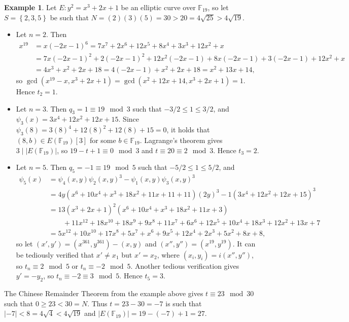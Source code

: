 \documentclass{article}
\newcommand{\F}{\mathbb{F}}
\newcommand{\rb}[1]{\left( #1 \right)}
\renewcommand{\sb}[1]{\left[ #1 \right]}
\newcommand{\cb}[1]{\left\{ #1 \right\}}
\newcommand{\abs}[1]{\left\lvert #1 \right\rvert}
\theoremstyle{definition}\newtheorem*{definition}{Definition}
\theoremstyle{definition}\newtheorem*{example}{Example}
\theoremstyle{definition}\newtheorem*{remark}{Remark}
\begin{document}
\begin{example}
Let $ E : y^2 = x^3 + 2x + 1 $ be an elliptic curve over $ \F_{19} $, so let $ S = \cb{2, 3, 5} $ be such that $ N = \rb{2}\rb{3}\rb{5} = 30 > 20 = 4\sqrt{25} > 4\sqrt{19} $.
\begin{itemize}
\item Let $ n = 2 $. Then
\begin{align*}
x^{19}
& = x\rb{-2x - 1}^6
= 7x^7 + 2x^6 + 12x^5 + 8x^4 + 3x^3 + 12x^2 + x \\
& = 7x\rb{-2x - 1}^2 + 2\rb{-2x - 1}^2 + 12x^2\rb{-2x - 1} + 8x\rb{-2x - 1} + 3\rb{-2x - 1} + 12x^2 + x \\
& = 4x^3 + x^2 + 2x + 18
= 4\rb{-2x - 1} + x^2 + 2x + 18
= x^2 + 13x + 14,
\end{align*}
so $ \gcd\rb{x^{19} - x, x^3 + 2x + 1} = \gcd\rb{x^2 + 12x + 14, x^3 + 2x + 1} = 1 $. Hence $ t_2 = 1 $.
\item Let $ n = 3 $. Then $ q_3 = 1 \equiv 19 \mod 3 $ such that $ -3 / 2 \le 1 \le 3 / 2 $, and $ \psi_3\rb{x} = 3x^4 + 12x^2 + 12x + 15 $. Since $ \psi_3\rb{8} = 3\rb{8}^4 + 12\rb{8}^2 + 12\rb{8} + 15 = 0 $, it holds that $ \rb{8, b} \in E\rb{\F_{19}}\sb{3} $ for some $ b \in \F_{19} $. Lagrange's theorem gives $ 3 \mid \abs{E\rb{\F_{19}}} $, so $ 19 - t + 1 \equiv 0 \mod 3 $ and $ t \equiv 20 \equiv 2 \mod 3 $. Hence $ t_3 = 2 $.
\item Let $ n = 5 $. Then $ q_5 = -1 \equiv 19 \mod 5 $ such that $ -5 / 2 \le 1 \le 5 / 2 $, and
\begin{align*}
\psi_5\rb{x}
& = \psi_4\rb{x, y}\psi_2\rb{x, y}^3 - \psi_1\rb{x, y}\psi_3\rb{x, y}^3 \\
& = 4y\rb{x^6 + 10x^4 + x^3 + 18x^2 + 11x + 11 + 11}\rb{2y}^3 - 1\rb{3x^4 + 12x^2 + 12x + 15}^3 \\
& = 13\rb{x^3 + 2x + 1}^2\rb{x^6 + 10x^4 + x^3 + 18x^2 + 11x + 3} \\
& \qquad + 11x^{12} + 18x^{10} + 18x^9 + 9x^8 + 11x^7 + 6x^6 + 12x^5 + 10x^4 + 18x^3 + 12x^2 + 13x + 7 \\
& = 5x^{12} + 10x^{10} + 17x^8 + 5x^7 + x^6 + 9x^5 + 12x^4 + 2x^3 + 5x^2 + 8x + 8,
\end{align*}
so let $ \rb{x', y'} = \rb{x^{361}, y^{361}} - \rb{x, y} $ and $ \rb{x'', y''} = \rb{x^{19}, y^{19}} $. It can be tediously verified that $ x' \ne x_1 $ but $ x' = x_2 $, where $ \rb{x_i, y_i} = i\rb{x'', y''} $, so $ t_n \equiv 2 \mod 5 $ or $ t_n \equiv -2 \mod 5 $. Another tedious verification gives $ y' = -y_2 $, so $ t_n \equiv -2 \equiv 3 \mod 5 $. Hence $ t_5 = 3 $.
\end{itemize}
The Chinese Remainder Theorem from the example above gives $ t \equiv 23 \mod 30 $ such that $ 0 \ge 23 < 30 = N $. Thus $ t = 23 - 30 = -7 $ is such that $ \abs{-7} < 8 = 4\sqrt{4} < 4\sqrt{19} $ and $ \abs{E\rb{\F_{19}}} = 19 - \rb{-7} + 1 = 27 $.
\end{example}
\end{document}
